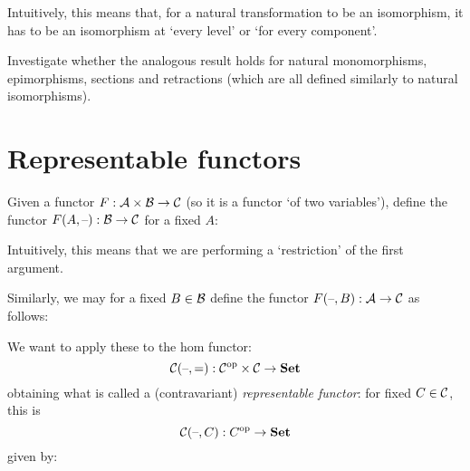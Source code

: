 Intuitively, this means that, for a natural transformation to be an isomorphism,
it has to be an isomorphism at `every level' or `for every component'.

\begin{exercise}
Investigate whether the analogous result holds for natural monomorphisms,
epimorphisms, sections and retractions (which are all defined similarly to
natural isomorphisms).
\end{exercise}

\section{Representable functors}

Given a functor $F: \mathcal{A} \times \mathcal{B} \to \mathcal{C}$ (so it is a functor
`of two variables'), define the functor $F (A, \text{--}): \mathcal{B} \to \mathcal{C}$
for a fixed $A$:

\begin{center}
\end{center}

Intuitively, this means that we are performing a `restriction' of the first
argument.

Similarly, we may for a fixed $B \in \mathcal{B}$ define the functor
$F (\text{--}, B) : \mathcal{A} \to \mathcal{C}$ as follows:

\begin{center}
\end{center}

We want to apply these to the hom functor:
\[ \mathcal{C} (\text{--}, \text{=}): {\mathcal{C}}^{\mathrm{op}} \times \mathcal{C} \to \mathbf {Set} \]
obtaining what is called a (contravariant) \emph{representable functor}: for
fixed $C \in \mathcal{C}$, this is
\[
\mathcal{C} (\text{--}, C): C^{\mathrm{op}} \to \mathbf {Set} 
\]
given by:

\begin{center}
\end{center}

